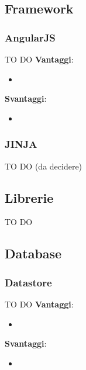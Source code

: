 
	\subsection{Framework} %
	\label{sub:framework}
		\subsubsection{AngularJS} %
		\label{ssub:angularjs}
		TO DO \newline
		\textbf{Vantaggi}:
			\begin{itemize}
				\item 
			\end{itemize}
			\noindent
		
		\textbf{Svantaggi}:
			\begin{itemize}
				\item 
			\end{itemize}
			\noindent

		\subsubsection{JINJA} %
		\label{ssub:jinja}
		TO DO (da decidere)


	\subsection{Librerie} %
	\label{sub:librerie}
	TO DO

	\subsection{Database} %
	\label{sub:database}

		\subsubsection{Datastore} %
		\label{ssub:datastore}
		TO DO \newline
		\textbf{Vantaggi}:
			\begin{itemize}
				\item 
			\end{itemize}
			\noindent
		
		\textbf{Svantaggi}:
			\begin{itemize}
				\item 
			\end{itemize}
			\noindent


